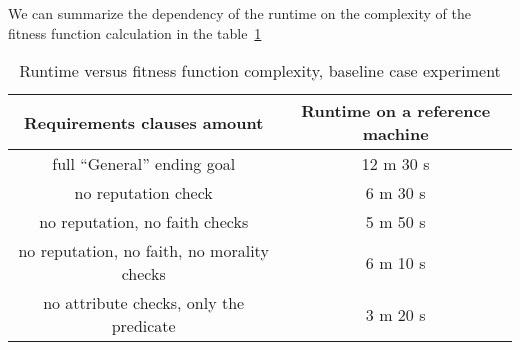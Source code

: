 \documentclass[12pt, a4paper]{report}
\begin{document}
	We can summarize the dependency of the runtime on the complexity of the fitness function calculation in the table~\ref{table::runtime-per-complexity}
	
	
	\begin{table}[h!]
		\centering
		\caption{Runtime versus fitness function complexity, baseline case experiment}
		\label{table::runtime-per-complexity}
		\begin{tabular}{|c|c|}
			\hline
			Requirements clauses amount & Runtime on a reference machine \\ \hline
			full ``General'' ending goal & 12 m 30 s  \\ \hline
			no reputation check & 6 m 30 s \\ \hline
			no reputation, no faith checks & 5 m 50 s \\ \hline
			no reputation, no faith, no morality checks & 6 m 10 s \\ \hline
			no attribute checks, only the predicate & 3 m 20 s \\ \hline
		\end{tabular}
	\end{table}
	
\end{document}
